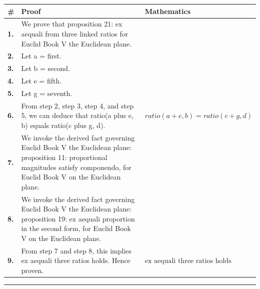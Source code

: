 \documentclass[11pt]{article}
\theoremstyle{definition}
\begin{document}
\begin{tabular}{@{} >{\raggedright\arraybackslash}p{} >{\raggedright\arraybackslash}p{} >{\raggedleft\arraybackslash}p{} @{}}
\textbf{\#} & \textbf{Proof} & \textbf{Mathematics} \\
\midrule
\textbf{1.} & We prove that proposition 21: ex aequali from three linked ratios for Euclid Book V the Euclidean plane. & \\[0.45em]
\textbf{2.} & Let a = first. & \\[0.45em]
\textbf{3.} & Let b = second. & \\[0.45em]
\textbf{4.} & Let e = fifth. & \\[0.45em]
\textbf{5.} & Let g = seventh. & \\[0.45em]
\textbf{6.} & From step 2, step 3, step 4, and step 5, we can deduce that ratio(a plus e, b) equals ratio(c plus g, d). & $\displaystyle ratio(a + e, b) = ratio(c + g, d)$ \\[0.45em]
\textbf{7.} & We invoke the derived fact governing Euclid Book V the Euclidean plane: proposition 11: proportional magnitudes satisfy componendo, for Euclid Book V on the Euclidean plane. & \\[0.45em]
\textbf{8.} & We invoke the derived fact governing Euclid Book V the Euclidean plane: proposition 19: ex aequali proportion in the second form, for Euclid Book V on the Euclidean plane. & \\[0.45em]
\textbf{9.} & From step 7 and step 8, this implies ex aequali three ratios holds. Hence proven. & $\displaystyle \text{ex aequali three ratios holds}$ \\[0.45em]
\bottomrule
\end{tabular}
\label{thm:Geometry-Euclid Book V-proposition_21_ex_aequali_from_three_linked_ratios}
\par\medskip\hrule
\end{document}

